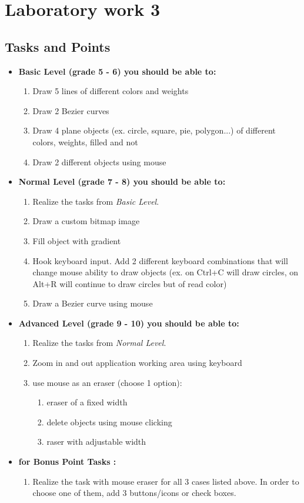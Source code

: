 \section{Laboratory work 3}

\subsection{Tasks and Points}
\begin{itemize}
\item \textbf{Basic Level (grade 5 - 6) you should be able to:}
	\begin{enumerate}
	\item Draw 5 lines of different colors and weights
      \item Draw 2 Bezier curves
      \item Draw 4 plane objects (ex. circle, square, pie, polygon...) of different colors, weights, filled and not
      \item Draw 2 different objects using mouse
      \end{enumerate}
\item \textbf{Normal Level (grade 7 - 8) you should be able to:}
      \begin{enumerate}
    \item Realize the tasks from \textit{Basic Level}.
    \item Draw a custom bitmap image
    \item Fill object with gradient
    \item Hook keyboard input. Add 2 different keyboard combinations that will change mouse ability to draw objects (ex. on Ctrl+C will draw circles, on Alt+R will continue to draw circles but of read color)
    \item Draw a Bezier curve using mouse
          \end{enumerate}
\item \textbf{Advanced Level (grade 9 - 10) you should be able to:}
      \begin{enumerate}
    \item Realize the tasks from \textit{Normal Level}.
    \item Zoom in and out application working area using keyboard
    \item use mouse as an eraser (choose 1 option):
    	\begin{enumerate}
        \item eraser of a fixed width
        \item delete objects using mouse clicking
        \item raser with adjustable width
        \end{enumerate}
          \end{enumerate}
\item \textbf{for Bonus Point Tasks :}
\begin{enumerate}
	\item Realize the task with mouse eraser for all 3 cases listed above. In order to choose one of them, add 3 buttons/icons or check boxes.
    \end{enumerate}
  \end{itemize}  

\clearpage